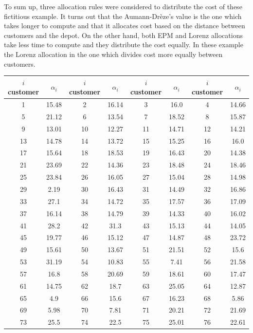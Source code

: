 To sum up, three allocation rules were considered to distribute the cost of these fictitious example. It turns out that the Aumann-Dr\`eze's value is the one which takes longer to compute and that it allocates cost based on the distance between customers and the depot. On the other hand, both EPM and Lorenz allocations take less time to compute and they distribute the cost equally. In these example the Lorenz allocation in the one which divides cost more equally between customers.
\clearpage
\begin{table}[H]
	\centering
	\begin{tabular}{c| c |c |c |c|c|c|c}
		\hline 
		$i$ customer & $\alpha_i$ & $i$ customer & $\alpha_i$ & $i$ customer & $\alpha_i$& $i$ customer & $\alpha_i$\\
		\hline
		1 & 15.48 & 2 & 16.14 & 3 & 16.0 & 4 & 14.66 \\
		5 & 21.12 & 6 & 13.54 & 7 & 18.52 & 8 & 15.87 \\
		9 & 13.01 & 10 & 12.27 & 11 & 14.71 & 12 & 14.21 \\
		13 & 14.78 & 14 & 13.72 & 15 & 15.25 & 16 & 16.0 \\
		17 & 15.64 & 18 & 18.53 & 19 & 16.43 & 20 & 14.38 \\
		21 & 23.69 & 22 & 14.36 & 23 & 18.48 & 24 & 18.46 \\
		25 & 23.84 & 26 & 16.05 & 27 & 15.04 & 28 & 14.98 \\
		29 & 2.19 & 30 & 16.43 & 31 & 14.49 & 32 & 16.86 \\
		33 & 27.1 & 34 & 14.72 & 35 & 17.57 & 36 & 17.09 \\
		37 & 16.14 & 38 & 14.79 & 39 & 14.33 & 40 & 16.02 \\
		41 & 28.2 & 42 & 31.3 & 43 & 15.13 & 44 & 14.05 \\
		45 & 19.77 & 46 & 15.12 & 47 & 14.87 & 48 & 23.72 \\
		49 & 15.61 & 50 & 13.67 & 51 & 21.51 & 52 & 15.6 \\
		53 & 31.19 & 54 & 10.83 & 55 & 7.41 & 56 & 21.58 \\
		57 & 16.8 & 58 & 20.69 & 59 & 18.61 & 60 & 17.47 \\
		61 & 14.75 & 62 & 18.7 & 63 & 25.05 & 64 & 12.87 \\
		65 & 4.9 & 66 & 15.6 & 67 & 16.23 & 68 & 5.86 \\
		69 & 5.98 & 70 & 7.81 & 71 & 20.21 & 72 & 21.69 \\
		73 & 25.5 & 74 & 22.5 & 75 & 25.01 & 76 & 22.61 \\

\end{tabular}
\end{table}
